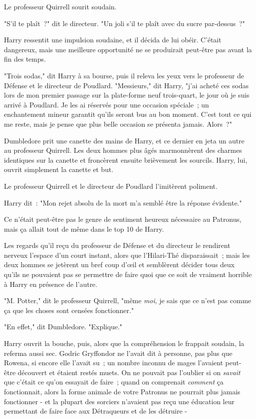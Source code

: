 Le professeur Quirrell sourit soudain.

"S'il te plaît~?" dit le directeur. "Un joli s'il te plaît avec du sucre par-dessus~?"

Harry ressentit une impulsion soudaine, et il décida de lui obéir. C'était dangereux, mais une meilleure opportunité ne se produirait peut-être pas avant la fin des temps.

"Trois sodas," dit Harry à sa bourse, puis il releva les yeux vers le professeur de Défense et le directeur de Poudlard. "Messieurs," dit Harry, "j'ai acheté ces sodas lors de mon premier passage sur la plate-forme neuf trois-quart, le jour où je suis arrivé à Poudlard. Je les ai réservés pour une occasion spéciale~; un enchantement mineur garantit qu'ils seront bus au bon moment. C'est tout ce qui me reste, mais je pense que plus belle occasion se présenta jamais. Alors~?"

Dumbledore prit une canette des mains de Harry, et ce dernier en jeta un autre au professeur Quirrell. Les deux hommes plus âgés marmonnèrent des charmes identiques sur la canette et froncèrent ensuite brièvement les sourcils. Harry, lui, ouvrit simplement la canette et but.

Le professeur Quirrell et le directeur de Poudlard l'imitèrent poliment.

Harry dit~: "Mon rejet absolu de la mort m'a semblé être la réponse évidente."

Ce n'était peut-être pas le genre de sentiment heureux nécessaire au Patronus, mais ça allait tout de même dans le top 10 de Harry.

Les regards qu'il reçu du professeur de Défense et du directeur le rendirent nerveux l'espace d'un court instant, alors que l'Hilari-Thé disparaissait~; mais les deux hommes se jetèrent un bref coup d'œil et semblèrent décider tous deux qu'ils ne pouvaient pas se permettre de faire quoi que ce soit de vraiment horrible à Harry en présence de l'autre.

"M. Potter," dit le professeur Quirrell, "même \emph{moi}, je sais que ce n'est pas comme ça que les choses sont censées fonctionner."

"En effet," dit Dumbledore. "Explique."

Harry ouvrit la bouche, puis, alors que la compréhension le frappait soudain, la referma aussi sec. Godric Gryffondor ne l'avait dit à personne, pas plus que Rowena, si encore elle l'avait su~; un nombre inconnu de mages l'avaient peut-être découvert et étaient restés muets. On ne pouvait pas l'oublier si on \emph{savait} que c'était ce qu'on essayait de faire~; quand on comprenait \emph{comment} ça fonctionnait, alors la forme animale de votre Patronus ne pourrait plus jamais fonctionner - et la plupart des sorciers n'avaient pas reçu une éducation leur permettant de faire face aux Détraqueurs et de les détruire -


